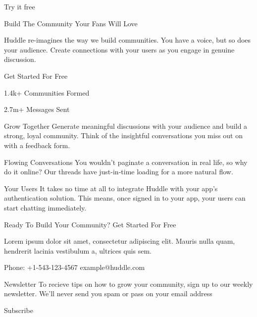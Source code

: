 Try it free

  Build The Community Your Fans Will Love

  Huddle re-imagines the way we build communities. You have a voice, but so does 
  your audience. Create connections with your users as you engage in genuine discussion. 

  Get Started For Free

  1.4k+
  Communities Formed

  2.7m+
  Messages Sent

  Grow Together
  Generate meaningful discussions with your audience and build a strong, loyal community. 
  Think of the insightful conversations you miss out on with a feedback form. 

  Flowing Conversations
  You wouldn't paginate a conversation in real life, so why do it online? Our threads have 
  just-in-time loading for a more natural flow.

  Your Users
  It takes no time at all to integrate Huddle with your app's authentication solution. This means, 
  once signed in to your app, your users can start chatting immediately.

  Ready To Build Your Community?
  Get Started For Free

  Lorem ipsum dolor sit amet, consectetur adipiscing elit. Mauris nulla quam, hendrerit lacinia 
  vestibulum a, ultrices quis sem.
  
  Phone: +1-543-123-4567
  example@huddle.com

  Newsletter
  To recieve tips on how to grow your community, sign up to our weekly newsletter. We’ll never 
  send you spam or pass on your email address

  Subscribe
